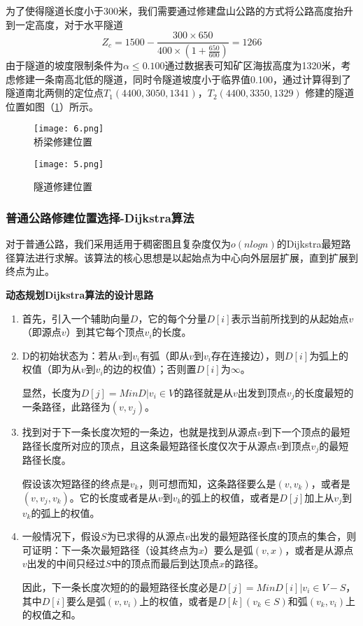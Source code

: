 \documentclass[bwprint]{cumcmthesis}
\begin{document}
为了使得隧道长度小于300米，我们需要通过修建盘山公路的方式将公路高度抬升到一定高度，对于水平隧道
$$Z_c = 1500-\frac{300\times650}{400\times(1+\frac{650}{600})} = 1266$$
由于隧道的坡度限制条件为$\alpha \leqslant 0.100$通过数据表可知矿区海拔高度为1320米，考虑修建一条南高北低的隧道，同时令隧道坡度小于临界值0.100，通过计算得到了隧道南北两侧的定位点$T_1(4400,3050,1341)$，$T_2(4400,3350,1329)$
修建的隧道位置如图（\ref{隧道修建位置}）所示。

\begin{figure}[h]  
\begin{minipage}[t]{0.5\textwidth}
\centering  
\texttt{[image: 6.png]} \\
\caption{桥梁修建位置} \label{桥梁修建位置}
\end{minipage}
\hspace{1ex}
\begin{minipage}[t]{0.5\textwidth}  
\centering  
\texttt{[image: 5.png]}\\
\caption{隧道修建位置}  \label{隧道修建位置}
\end{minipage}  
\end{figure} 

\subsubsection{普通公路修建位置选择-Dijkstra算法}
对于普通公路，我们采用适用于稠密图且复杂度仅为$o(nlogn)$的Dijkstra最短路径算法进行求解。该算法的核心思想是以起始点为中心向外层层扩展，直到扩展到终点为止。

\textbf{动态规划Dijkstra算法的设计思路}

\begin{enumerate}
	\item 首先，引入一个辅助向量$D$，它的每个分量$D[i]$表示当前所找到的从起始点$v$（即源点$v$）到其它每个顶点$v_i$的长度。
	\item D的初始状态为：若从$v$到$v_i$有弧（即从$v$到$v_i$存在连接边），则$D[i]$为弧上的权值（即为从$v$到$v_i$的边的权值）；否则置$D[i]$为$\infty$。

		显然，长度为$D[j]= Min{ D |v_i \in V}$的路径就是从$v$出发到顶点$v_j$的长度最短的一条路径，此路径为$(v,v_j)$。
	\item 找到对于下一条长度次短的一条边，也就是找到从源点$v$到下一个顶点的最短路径长度所对应的顶点，且这条最短路径长度仅次于从源点$v$到顶点$v_j$的最短路径长度。
 
	假设该次短路径的终点是$v_k$，则可想而知，这条路径要么是$(v,v_k)$，或者是$(v,v_j,v_k)$。它的长度或者是从$v$到$v_k$的弧上的权值，或者是$D[j]$加上从$v_j$到$v_k$的弧上的权值。
	\item 一般情况下，假设$S$为已求得的从源点$v$出发的最短路径长度的顶点的集合，则可证明：下一条次最短路径（设其终点为$x$）要么是弧$(v,x)$，或者是从源点$v$出发的中间只经过$S$中的顶点而最后到达顶点$x$的路径。

	因此，下一条长度次短的的最短路径长度必是$D[j]= Min { D[i] |v_i \in V-S}$，其中$D[i]$要么是弧$(v,v_i)$上的权值，或者是$D[k](v_k \in S)$和弧$(v_k,v_i)$上的权值之和。
\end{enumerate}
\end{document}
